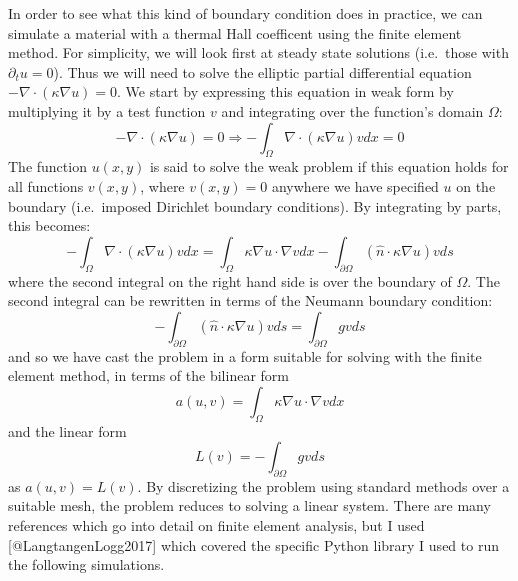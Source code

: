 In order to see what this kind of boundary condition does in practice,
we can simulate a material with a thermal Hall coefficent using the
finite element method. For simplicity, we will look first at steady
state solutions (i.e.~those with \(\partial_t u = 0\)). Thus we will
need to solve the elliptic partial differential equation
\(-\nabla \cdot (\kappa \nabla u) = 0\). We start by expressing this
equation in weak form by multiplying it by a test function \(v\) and
integrating over the function's domain \(\Omega\):
\[ -\nabla \cdot (\kappa \nabla u) = 0 \Rightarrow -\int_\Omega \nabla \cdot
(\kappa \nabla u) v dx = 0 \] The function \(u(x,y)\) is said to solve
the weak problem if this equation holds for all functions \(v(x,y)\),
where \(v(x, y) = 0\) anywhere we have specified \(u\) on the boundary
(i.e.~imposed Dirichlet boundary conditions). By integrating by parts,
this becomes:
\[ - \int_\Omega \nabla \cdot (\kappa \nabla u) v dx = \int_\Omega \kappa \nabla
u \cdot \nabla v dx - \int_{\partial \Omega} (\hat{n} \cdot \kappa\nabla u) v ds\]
where the second integral on the right hand side is over the boundary of
\(\Omega\). The second integral can be rewritten in terms of the Neumann
boundary condition:
\[ - \int_{\partial\Omega} (\hat{n} \cdot \kappa \nabla u) v ds =
\int_{\partial\Omega} g v ds\] and so we have cast the problem in a form
suitable for solving with the finite element method, in terms of the
bilinear form
\[ a(u, v) = \int_\Omega \kappa \nabla u \cdot \nabla v dx \] and the
linear form \[ L(v) = -\int_{\partial \Omega} g v ds \] as
\(a(u, v) = L(v)\). By discretizing the problem using standard methods
over a suitable mesh, the problem reduces to solving a linear system.
There are many references which go into detail on finite element
analysis, but I used {[}@LangtangenLogg2017{]} which covered the
specific Python library I used to run the following simulations.

